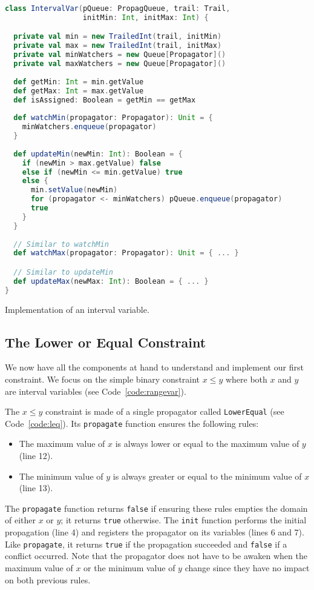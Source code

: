 \documentclass{llncs}
\begin{document}
\begin{code}
\begin{lstlisting}[language=scala, style=lineNumber]
class IntervalVar(pQueue: PropagQueue, trail: Trail, 
                  initMin: Int, initMax: Int) {

  private val min = new TrailedInt(trail, initMin)
  private val max = new TrailedInt(trail, initMax)
  private val minWatchers = new Queue[Propagator]()
  private val maxWatchers = new Queue[Propagator]()
  
  def getMin: Int = min.getValue
  def getMax: Int = max.getValue
  def isAssigned: Boolean = getMin == getMax
  
  def watchMin(propagator: Propagator): Unit = {
    minWatchers.enqueue(propagator)
  }
  
  def updateMin(newMin: Int): Boolean = {
    if (newMin > max.getValue) false
    else if (newMin <= min.getValue) true
    else {
      min.setValue(newMin)
      for (propagator <- minWatchers) pQueue.enqueue(propagator)
      true
    }
  }
  
  // Similar to watchMin
  def watchMax(propagator: Propagator): Unit = { ... }

  // Similar to updateMin
  def updateMax(newMax: Int): Boolean = { ... }
}
\end{lstlisting}
\caption{Implementation of an interval variable.}
\label{code:rangevar}
\end{code}

\subsection{The Lower or Equal Constraint}
\label{sec:leq}

We now have all the components at hand to understand and implement our first constraint.
We focus on the simple binary constraint $x \leq y$ where both $x$ and $y$ are interval variables (see Code~\ref{code:rangevar}).

The $x \leq y$ constraint is made of a single propagator called \texttt{LowerEqual} (see Code~\ref{code:leq}). Its \texttt{propagate} function ensures the following rules: 
%
\begin{itemize}
  \item The maximum value of $x$ is always lower or equal to the maximum value of $y$ (line 12).
  \item The minimum value of $y$ is always greater or equal to the minimum value of $x$ (line 13).
\end{itemize}
%
The \texttt{propagate} function returns \texttt{false} if ensuring these rules empties the domain of either $x$ or $y$; it returns \texttt{true} otherwise. 
The \texttt{init} function performs the initial propagation (line 4) and registers the propagator on its variables (lines 6 and 7). 
Like \texttt{propagate}, it returns \texttt{true} if the propagation succeeded and \texttt{false} if a conflict occurred. 
Note that the propagator does not have to be awaken when the maximum value of $x$ or the minimum value of $y$ change since they have no impact on both previous rules. 
\end{document}
